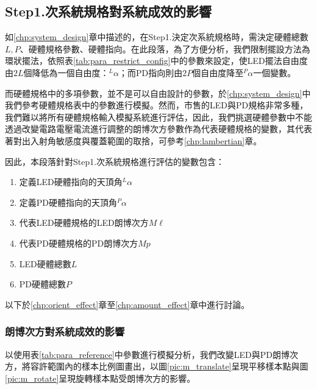 \subsection{Step1.次系統規格對系統成效的影響}
\label{chp:design_result}

如\ref{chp:system_design}章中描述的，在Step1.決定次系統規格時，需決定硬體總數$L,P$、硬體規格參數、硬體指向。在此段落，為了方便分析，我們限制擺設方法為環狀擺法，依照表\ref{tab:para_restrict_config}中的參數來設定，使LED擺法自由度由$2L$個降低為一個自由度：$^L\alpha$；而PD指向則由$2P$個自由度降至$^P\alpha$一個變數。

而硬體規格中的多項參數，並不是可以自由設計的參數，於\ref{chp:system_design}中我們參考硬體規格表中的參數進行模擬。然而，市售的LED與PD規格非常多種，我們難以將所有硬體規格輸入模擬系統進行評估，因此，我們挑選硬體參數中不能透過改變電路電壓電流進行調整的朗博次方參數作為代表硬體規格的變數，其代表著對出入射角敏感度與覆蓋範圍的取捨，可參考\ref{chp:lambertian}章。

因此，本段落針對Step1.次系統規格進行評估的變數包含：
\begin{enumerate}
    \item 定義LED硬體指向的天頂角$^L\alpha$
    \item 定義PD硬體指向的天頂角$^P\alpha$
    \item 代表LED硬體規格的LED朗博次方$M\ell$
    \item 代表PD硬體規格的PD朗博次方$Mp$
    \item LED硬體總數$L$
    \item PD硬體總數$P$

\end{enumerate}

以下於\ref{chp:orient_effect}章至\ref{chp:amount_effect}章中進行討論。



\subsubsection{朗博次方對系統成效的影響}
\label{chp:m_effect}

以使用表\ref{tab:para_reference}中參數進行模擬分析，我們改變LED與PD朗博次方，將容許範圍內的樣本比例圖畫出，以圖\ref{pic:m_translate}呈現平移樣本點與圖\ref{pic:m_rotate}呈現旋轉樣本點受朗博次方的影響。


